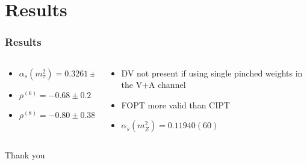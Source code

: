 \documentclass[fleqn]{beamer}
\begin{document}
\section{Results}
\begin{frame}
  \frametitle{Results}
  \begin{columns}{\textwidth}
    \begin{column}{.5\textwidth}
      \begin{itemize}
      \item \(\alpha_s(m_\tau^2) = 0.3261 \pm 0.0050\)
      \item \(\rho^{(6)} = -0.68 \pm 0.2\)
      \item \(\rho^{(8)} = -0.80 \pm 0.38\)
      \end{itemize}
    \end{column} \pause
    \begin{column}{.5\textwidth}
      \begin{itemize}
      \item DV not present if using single pinched weights in the V+A channel
      \item FOPT more valid than CIPT
      \item \(\alpha_s(m_Z^2) = 0.11940(60)\)
      \end{itemize}
    \end{column}
  \end{columns}
\end{frame}


\begin{frame}
  \centering
  \LARGE
  Thank you
\end{frame}


\begin{frame}
  \printbibliography
\end{frame}
\end{document}
